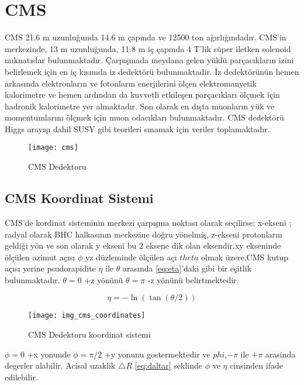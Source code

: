 \section{CMS}
CMS 21.6 m uzunluğunda 14.6 m çapında ve 12500 ton ağırlığındadır. CMS'in merkezinde, 13 m uzunluğunda, 11.8 m iç çapında 4 T'lik süper iletken solenoid mıknatıslar bulunmaktadır. Çarpışmada meydana gelen yüklü parçacıkların izini belirlemek için en iç kısımda iz dedektörü bulunmaktadir. İz dedektörünün hemen arkasında elektronların ve fotonların enerjilerini ölçen elektromanyetik kalorimetre ve hemen ardından da kuvvetli etkileşen parçacıkları ölçmek için hadronik kalorimetre yer almaktadır. Son olarak en dışta muonların yük ve momentumlarını ölçmek için muon odacıkları bulunmaktadır. CMS dedektörü Higgs arayışı dahil SUSY gibi teorileri sınamak için veriler toplamaktadır.
\begin{figure}[!htbp]
\begin{center}
\texttt{[image: cms]}
\caption{CMS Dedektoru}
\end{center}
\end{figure}

\newpage
\subsection{CMS Koordinat Sistemi}
CMS'de kordinat sisteminin merkezi çarpışma noktası olarak seçilirse; x-ekseni ; radyal olarak BHC halkasının merkezine doğru yönelmiş, z-ekseni protonların geldiği yön ve son olarak y ekseni bu 2 eksene dik olan eksendir.xy ekseninde ölçülen azimut açısı $\phi$ yz düzleminde ölçülen açı $theta$ olmak üzere,CMS kutup açısı yerine psudorapidite $\eta$ ile $\theta$ arasında \ref{eq:eta}'daki gibi bir eşitlik bulunmaktadır. $\theta=0$ +z yönünü $\theta=\pi$ -z yönünü belirtmektedir.

\begin{equation} 
\eta = -\ln\left( \tan({\theta}/{2}) \right )
\label{eq:eta}
\end{equation}

\begin{figure}[!htbp]
\begin{center}
\texttt{[image: img\_cms\_coordinates]}
\caption{CMS Dedektoru koordinat sistemi}
\end{center}
\end{figure}

$\phi=0$ +x yonunde $\phi=\pi/2$ +y yonunu gostermektedir ve $phi$,$-\pi$ ile $+\pi$ arasinda degerler alabilir. Acisal uzaklik $\triangle R$ \ref{eq:daltar} seklinde $\phi$ ve $\eta$ cinsinden ifade edilebilir.

